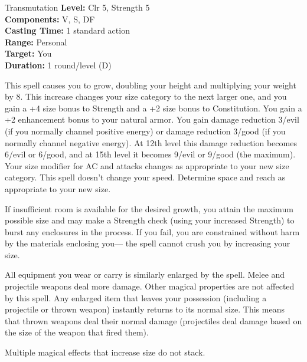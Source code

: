 {Transmutation}
{
	\textbf{Level:}
	Clr 5, Strength 5\\
	\textbf{Components:}
	V, S, DF\\
	\textbf{Casting Time:}
	1 standard action\\
	\textbf{Range:}
	Personal\\
	\textbf{Target:}
	You\\
	\textbf{Duration:}
	1 round/level (D)\\
}
{
	This spell causes you to grow, doubling your height and multiplying your weight by 8. This increase changes your size category to the next larger one, and you gain a +4 size bonus to Strength and a +2 size bonus to Constitution. You gain a +2 enhancement bonus to your natural armor. You gain damage reduction 3/evil (if you normally channel positive energy) or damage reduction 3/good (if you normally channel negative energy). At 12th level this damage reduction becomes 6/evil or 6/good, and at 15th level it becomes 9/evil or 9/good (the maximum). Your size modifier for AC and attacks changes as appropriate to your new size category. This spell doesn't change your speed. Determine space and reach as appropriate to your new size.

	If insufficient room is available for the desired growth, you attain the maximum possible size and may make a Strength check (using your increased Strength) to burst any enclosures in the process. If you fail, you are constrained without harm by the materials enclosing you--- the spell cannot crush you by increasing your size.

	All equipment you wear or carry is similarly enlarged by the spell. Melee and projectile weapons deal more damage. Other magical properties are not affected by this spell. Any enlarged item that leaves your possession (including a projectile or thrown weapon) instantly returns to its normal size. This means that thrown weapons deal their normal damage (projectiles deal damage based on the size of the weapon that fired them).

	Multiple magical effects that increase size do not stack.

}
